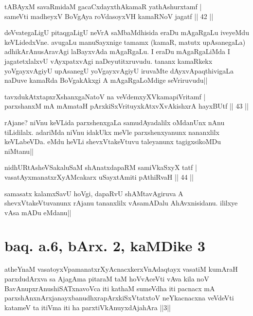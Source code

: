 \begin{shl}
tABAyxM savaRmidaM gacaCxdayxthAkamaR yathAshurxtamf | \\
sameVti madheyxV BoVgAya roVdasoyxVH kamaRNoV jagatf \hfill|| 42 || 
\end{shl}

\begin{artha}
deVvategaLigU pitaqgaLigU neVrA saMbaMdhisida eraDu mAgaRgaLu iveyeMdu 
keVLidedxVne. avugaLu manuSayxnige tamamx (kamaR, matutx upAsanegaLa) 
adhikArAnusAravAgi laBayxvAda mAgaRgaLu. I eraDu mAgaRgaLiMda I 
jagatetxlalxvU vAyxpatxvAgi naDeyutitxruvudu. tananx kamaRkekx 
yoVgayxvAgiyU upAsanegU yoVgayxvAgiyU iruvaMte dAyxvApaqthivigaLa 
naDuve kamaRda BoVgakAkxgi A mAgaRgaLoMdige seVriruvudu||
\end{artha}

\begin{shl}
tavxdukAtxtapxrXshanxgaNatoV na veVdemxyXVkamapiVritamf | \\
parxshanxM mA mAmataH pArxkiSxVrituyxkAtxvX\s vAkishxrA hayxBUtf \hfill|| 43 || 
\end{shl}

\begin{artha}
rAjane? niVnu keVLida parxshenxgaLa samudAyadalilx oMdanUnx nAnu 
tiLidilalx. adariMda niVnu idakUkx meVle parxshenxyanunx nananxlilx 
keVLabeVDa. eMdu heVLi shevxVtakeVtuvu taleyanunx tagigxsikoMDu 
niMtanu||
\end{artha}


\begin{shl}
nidhURtAsheVSakaluSaM shAnatxdapaRM samiVkaSxyX tatf | \\
vasatAyx\s \s manatxrXyAMcakarx uSayxtAmiti pAthiRvaH \hfill|| 44 || 
\end{shl}

\begin{artha}
samasatx kalamxSavU hoVgi, dapaRvU shAMtavAgiruva A 
shevxVtakeVtuvanunx rAjanu tananxlilx vAsamADalu AhAvxnisidanu. 
ililxye vAsa mADu eMdanu||
\end{artha}

\section*{baq. a.6, bArx. 2, kaMDike 3}

\begin{shl}
atheYnaM vasatoyxVpamanatxrXyAcnacxkerxV\s nAdaqtayx vasatiM kumAraH parxdudArxva sa AjagAma pitaraM taM hoVvAceVti vAva kila noV BavAnupxrAnushiSATxnavoVca iti kathaM sumeVdha iti pacnacx mA parxshAnxnArxjanayxbanudhxrapArxkiSxVtatxtoV neYkacnacxna veVdeVti katameV ta itiVma iti ha parxtiVkAnuyxdAjahAra ||3||
\end{shl}

